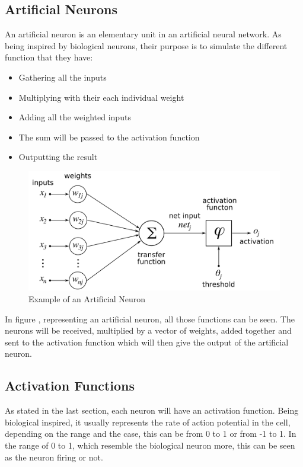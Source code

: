 \subsection{Artificial  Neurons}

An artificial neuron is an elementary unit in an artificial neural network. As being inspired by biological neurons, their purpose is to simulate the different function that they have:
\begin{itemize}
\item Gathering all the inputs
\item Multiplying with their each individual weight
\item Adding all the weighted inputs
\item The sum will be passed to the activation function
\item Outputting the result
\end{itemize}

\begin{figure}[htp]
	\centering
	\includegraphics[width=1\textwidth]{Illustrations/artificialneuron.png}
	\caption{Example of an Artificial Neuron}
	\label{fig:ArtificialNeuron}
\end{figure}

In figure , representing an artificial neuron, all those functions can be seen. The neurons will be received, multiplied by a vector of weights, added together and sent to the activation function which will then give the output of the artificial neuron.

\subsection{Activation Functions}

As stated in the last section, each neuron will have an activation function. Being biological inspired, it usually represents the rate of action potential in the cell, depending on the range and the case, this can be from 0 to 1 or from -1 to 1. In the range of 0 to 1, which resemble the biological neuron more, this can be seen as the neuron firing or not.

